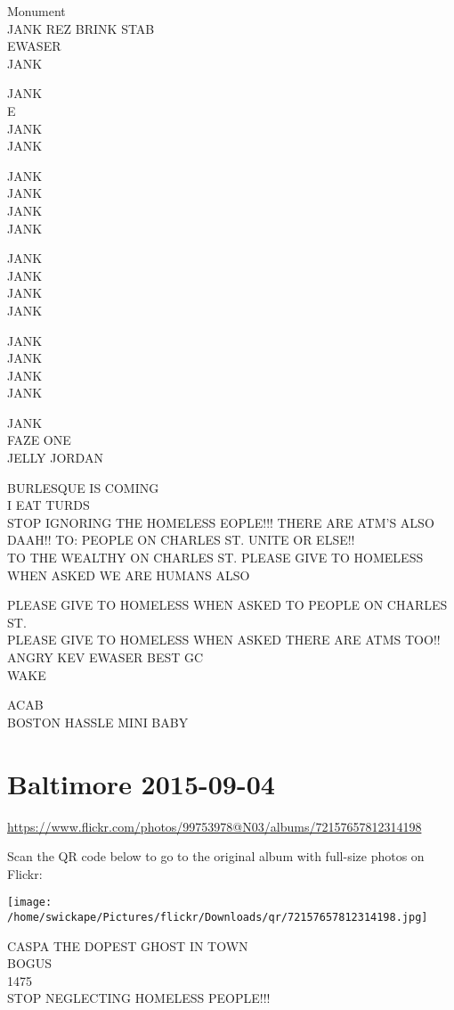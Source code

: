 \documentclass[10pt,letterpaper]{article}
\begin{document}
Monument\\
JANK REZ BRINK STAB\\
EWASER\\
JANK

JANK\\
E\\
JANK\\
JANK

JANK\\
JANK\\
JANK\\
JANK

JANK\\
JANK\\
JANK\\
JANK

JANK\\
JANK\\
JANK\\
JANK

JANK\\
FAZE ONE\\
JELLY JORDAN

BURLESQUE IS COMING\\
I EAT TURDS\\
STOP IGNORING THE HOMELESS EOPLE!!! THERE ARE ATM'S ALSO DAAH!! TO: PEOPLE ON CHARLES ST. UNITE OR ELSE!!\\
TO THE WEALTHY ON CHARLES ST.  PLEASE GIVE TO HOMELESS WHEN ASKED WE ARE HUMANS ALSO

PLEASE GIVE TO HOMELESS WHEN ASKED TO PEOPLE ON CHARLES ST.\\
PLEASE GIVE TO HOMELESS WHEN ASKED THERE ARE ATMS TOO!!\\
ANGRY KEV EWASER BEST GC\\
WAKE

ACAB\\
BOSTON HASSLE MINI BABY
\pagebreak

\section*{Baltimore 2015-09-04}

\url{https://www.flickr.com/photos/99753978@N03/albums/72157657812314198}

Scan the QR code below to go to the original album with full-size photos on Flickr:

\texttt{[image: /home/swickape/Pictures/flickr/Downloads/qr/72157657812314198.jpg]}
\pagebreak

CASPA THE DOPEST GHOST IN TOWN\\
BOGUS\\
1475\\
STOP NEGLECTING HOMELESS PEOPLE!!!
\end{document}
